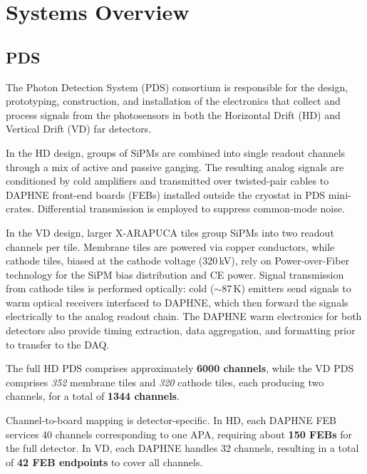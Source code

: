 
\section{Systems Overview}
\subsection{PDS}
The Photon Detection System (PDS) consortium is responsible for the design, prototyping, construction, and installation of the electronics that collect and process signals from the photosensors in both the Horizontal Drift (HD) and Vertical Drift (VD) far detectors.  

In the HD design, groups of SiPMs are combined into single readout channels through a mix of active and passive ganging. The resulting analog signals are conditioned by cold amplifiers and transmitted over twisted-pair cables to DAPHNE front-end boards (FEBs) installed outside the cryostat in PDS mini-crates. Differential transmission is employed to suppress common-mode noise.  

In the VD design, larger X-ARAPUCA tiles group SiPMs into two readout channels per tile. Membrane tiles are powered via copper conductors, while cathode tiles, biased at the cathode voltage (320\,kV), rely on Power-over-Fiber technology for the SiPM bias distribution and CE power. Signal transmission from cathode tiles is performed optically: cold ($\sim$87\,K) emitters send signals to warm optical receivers interfaced to DAPHNE, which then forward the signals electrically to the analog readout chain. The DAPHNE warm electronics for both detectors also provide timing extraction, data aggregation, and formatting prior to transfer to the DAQ.  

The full HD PDS comprises approximately \textbf{6000 channels}, while the VD PDS comprises \emph{352} membrane tiles and \emph{320} cathode tiles, each producing two channels, for a total of \textbf{1344 channels}.  

Channel-to-board mapping is detector-specific. In HD, each DAPHNE FEB services 40 channels corresponding to one APA, requiring about \textbf{150 FEBs} for the full detector. In VD, each DAPHNE handles 32 channels, resulting in a total of \textbf{42 FEB endpoints} to cover all channels.  
